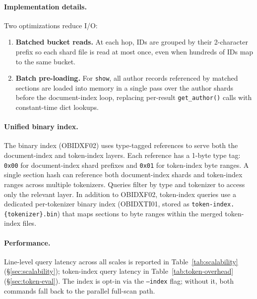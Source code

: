 \paragraph{Implementation details.}
Two optimizations reduce I/O:
\begin{enumerate}
	\item \textbf{Batched bucket reads.} At each hop, IDs are grouped by their 2-character prefix so each shard file is read at most once, even when hundreds of IDs map to the same bucket.
	\item \textbf{Batch pre-loading.} For \texttt{show}, all author records referenced by matched sections are loaded into memory in a single pass over the author shards before the document-index loop, replacing per-result \texttt{get\_author()} calls with constant-time dict lookups.
\end{enumerate}

\paragraph{Unified binary index.}
The binary index (OBIDXF02) uses type-tagged references to serve both the document-index and token-index layers. Each reference has a 1-byte type tag: \texttt{0x00} for document-index shard prefixes and \texttt{0x01} for token-index byte ranges. A single section hash can reference both document-index shards and token-index ranges across multiple tokenizers. Queries filter by type and tokenizer to access only the relevant layer. In addition to OBIDXF02, token-index queries use a dedicated per-tokenizer binary index (OBIDXTI01, stored as \texttt{token-index.\{tokenizer\}.bin}) that maps sections to byte ranges within the merged token-index files.

\paragraph{Performance.}
Line-level query latency across all scales is reported in Table~\ref{tab:scalability} (\S\ref{sec:scalability}); token-index query latency in Table~\ref{tab:token-overhead} (\S\ref{sec:token-eval}). The index is opt-in via the \texttt{--index} flag; without it, both commands fall back to the parallel full-scan path.
